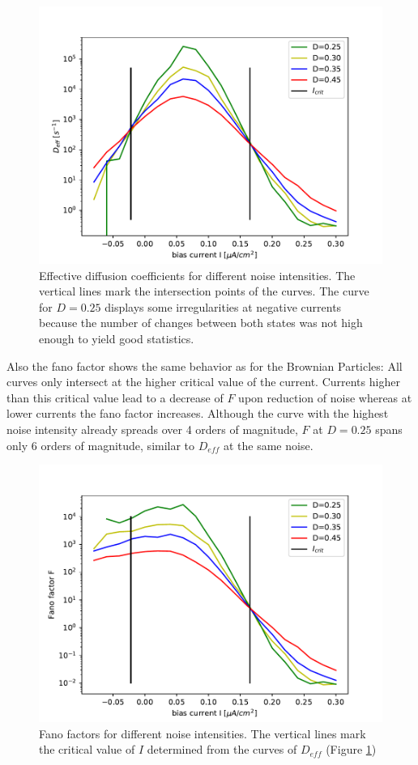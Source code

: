 \documentclass[12pt,a4paper]{article}
\begin{document}
\begin{figure}[H]
	\centering
	\includegraphics[scale=1]{dneurcrit3shrealfast19jjem2strealfast13aem2n4realfast11jjem2sh.pdf}\caption{Effective diffusion coefficients for different noise intensities. The vertical lines mark the intersection points of the curves. The curve for $D=0.25$ displays some irregularities at negative currents because the number of changes between both states was not high enough to yield good statistics.}
	\label{deff}
\end{figure}
Also the fano factor shows the same behavior as for the Brownian Particles: All curves only intersect at the higher critical value of the current. Currents higher than this critical value lead to a decrease of $F$ upon reduction of noise whereas at lower currents the fano factor increases. Although the curve with the highest noise intensity already spreads over 4 orders of magnitude, $F$ at $D=0.25$ spans only 6 orders of magnitude, similar to $D_{eff}$ at the same noise.
\begin{figure}[H]
	\centering
	\includegraphics[scale=1]{fneurcrit3shrealfast19jjem2strealfast13aem2n4realfast11jjem2sh.pdf}\caption{Fano factors for different noise intensities. The vertical lines mark the critical value of $I$ determined from the curves of $D_{eff}$ (Figure \ref{deff})}
	\label{fano}
\end{figure}
\end{document}
